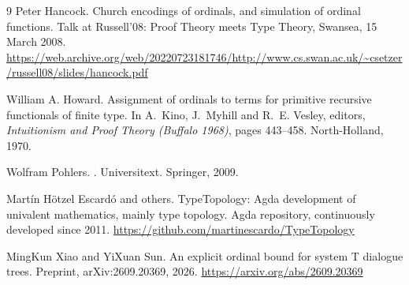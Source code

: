 \documentclass[11pt]{amsart}
\theoremstyle{plain}
\theoremstyle{definition}
\begin{document}
\begin{thebibliography}{9}
Peter Hancock.
\newblock Church encodings of ordinals, and simulation of ordinal
  functions.
\newblock Talk at Russell'08: Proof Theory meets Type Theory, Swansea,
  15 March 2008.
\newblock
  \url{https://web.archive.org/web/20220723181746/http://www.cs.swan.ac.uk/~csetzer/russell08/slides/hancock.pdf}

William A. Howard.
\newblock Assignment of ordinals to terms for primitive recursive
  functionals of finite type.
\newblock In A.~Kino, J.~Myhill and R.~E. Vesley, editors, {\em
  Intuitionism and Proof Theory (Buffalo 1968)}, pages 443--458.
  North-Holland, 1970.

Wolfram Pohlers.
.
\newblock Universitext. Springer, 2009.

Mart\'in H\"otzel Escard\'o and others.
\newblock TypeTopology: Agda development of univalent mathematics,
  mainly type topology.
\newblock Agda repository, continuously developed since 2011.
\newblock \url{https://github.com/martinescardo/TypeTopology}

MingKun Xiao and YiXuan Sun.
\newblock An explicit ordinal bound for system T dialogue trees.
\newblock Preprint, arXiv:2609.20369, 2026.
\newblock \url{https://arxiv.org/abs/2609.20369}

\end{thebibliography}
\end{document}
